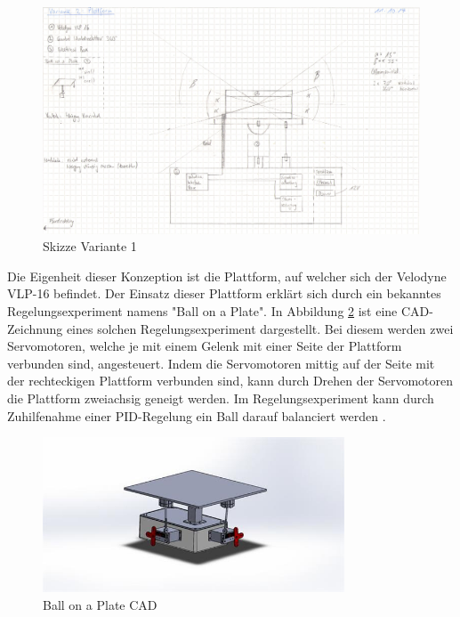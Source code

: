 \begin{figure}[H]
	\centering
	\includegraphics[width=1\textwidth]{resources/skizzev1.PNG}
	\caption[Skizze Variante 1]{Skizze Variante 1}
\label{fig:plattform}
\end{figure} 
	
 Die Eigenheit dieser Konzeption ist die Plattform, auf welcher sich der Velodyne VLP-16 befindet. Der Einsatz dieser Plattform erklärt sich durch ein bekanntes Regelungsexperiment namens "Ball on a Plate". In Abbildung \ref{fig:BalllonaPlateCAD} ist eine CAD-Zeichnung eines solchen Regelungsexperiment dargestellt. Bei diesem werden zwei Servomotoren, welche je mit einem Gelenk mit einer Seite der Plattform verbunden sind, angesteuert. Indem die Servomotoren mittig auf der Seite mit der rechteckigen Plattform verbunden sind, kann durch Drehen der Servomotoren die Plattform zweiachsig geneigt werden. Im Regelungsexperiment kann durch Zuhilfenahme einer PID-Regelung ein Ball darauf balanciert werden \cite{ballonaplate}.
 
\begin{figure}[H]
	\centering
 	\includegraphics[width=0.8\textwidth]{resources/ballonaplate_cad}
	\caption[Ball on a Plate CAD]{Ball on a Plate CAD {\cite{ballonaplate}}}
	\label{fig:BalllonaPlateCAD}
\end{figure} 


